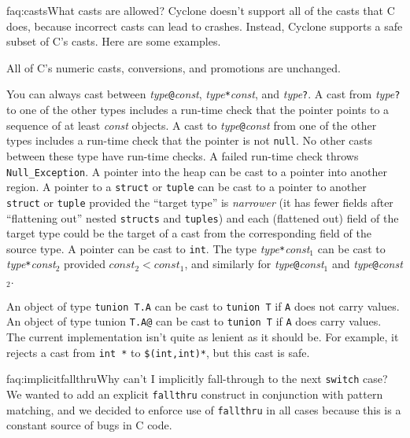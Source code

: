 \begin{faqa}{faq:casts}{What casts are allowed?}
Cyclone doesn't support all of the casts that C does, because
incorrect casts can lead to crashes.  Instead, Cyclone supports a safe
subset of C's casts.  Here are some examples.

All of C's numeric casts, conversions, and promotions are unchanged.

You can always cast between
\textit{type}\texttt{@}\lb\textit{const}\rb,
\textit{type}\texttt{*}\lb\textit{const}\rb, and
\textit{type}\texttt{?}.
A cast from 
\textit{type}\texttt{?}
to one of the other types includes a run-time check that the pointer
points to a sequence of at least \textit{const} objects.
A cast to
\textit{type}\texttt{@}\lb\textit{const}\rb
from one of the
other types includes a run-time check that the pointer is not
\texttt{null}.
No other casts between these type have run-time checks.
A failed run-time check throws \texttt{Null_Exception}.
A pointer into the heap can be cast to a pointer into another region.
A pointer to a \texttt{struct} or \texttt{tuple} can be
cast to a pointer to another \texttt{struct} or \texttt{tuple}
provided the ``target type'' 
is \emph{narrower} (it has fewer fields after ``flattening out'' nested
\texttt{structs} and \texttt{tuples}) and each (flattened out) field
of the target type could be the target of a cast from the
corresponding field of the source type.
A pointer can be cast to \texttt{int}.
The type
\textit{type}\texttt{*}\lb\textit{const}$_1$\rb
can be cast to
\textit{type}\texttt{*}\lb\textit{const}$_2$\rb
provided
$\textit{const}_2 < \textit{const}_1$, and similarly for
\textit{type}\texttt{@}\lb\textit{const}$_1$\rb
and
\textit{type}\texttt{@}\lb\textit{const}$_2$\rb.

An object of type \texttt{tunion T.A} can be cast to \texttt{tunion T}
if \texttt{A} does not carry values.  An object of type tunion
\texttt{T.A@} can be cast to \texttt{tunion T} if \texttt{A} does
carry values.  The current implementation isn't quite as lenient as it
should be.  For example, it rejects a cast from \texttt{int *\rb} to
\texttt{\$(int,int)*\rb}, but this cast is safe.
\end{faqa}

\begin{faqa}{faq:implicitfallthru}{Why can't I implicitly fall-through to the next \texttt{switch} case?}
We wanted to add an explicit \texttt{fallthru} construct in
conjunction with pattern matching, and we decided to enforce use of
\texttt{fallthru} in all cases because this is a constant source of
bugs in C code.
\end{faqa}

